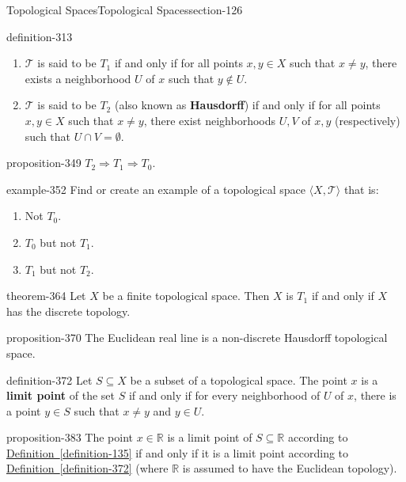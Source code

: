 \documentclass[oneside,10pt,]{article}
\newcommand{\terminology}[1]{\textbf{#1}}
\newcommand{\tuple}[1]{\langle #1 \rangle}
\newcommand{\mb}{\mathbb}
\newcommand{\mc}{\mathcal}
\begin{document}
\begin{sectionptx}{Topological Spaces}{}{Topological Spaces}{}{}{section-126}
\begin{definition}{}{definition-313}
\begin{enumerate}
\item\hypertarget{li-330}{}\(\mc T\) is said to be \terminology{\(T_1\)} if and only if for all points \(x,y\in X\) such that \(x\not=y\), there exists a neighborhood \(U\) of \(x\) such that \(y\not\in U\).%
\item\hypertarget{li-339}{}\(\mc T\) is said to be \terminology{\(T_2\)} (also known as \terminology{Hausdorff}) if and only if for all points \(x,y\in X\) such that \(x\not=y\), there exist neighborhoods \(U,V\) of \(x,y\) (respectively) such that \(U\cap V=\emptyset\).%
\end{enumerate}
\end{definition}
\begin{proposition}{}{}{proposition-349}%
\hypertarget{p-350}{}%
\(T_2\Rightarrow T_1\Rightarrow T_0\).%
\end{proposition}
\begin{example}{}{example-352}%
\hypertarget{p-353}{}%
Find or create an example of a topological space \(\tuple{X,\mc T}\) that is:%
\leavevmode%
\begin{enumerate}
\item\hypertarget{li-356}{}Not \(T_0\).%
\item\hypertarget{li-358}{}\(T_0\) but not \(T_1\).%
\item\hypertarget{li-361}{}\(T_1\) but not \(T_2\).%
\end{enumerate}
\end{example}
\begin{theorem}{}{}{theorem-364}%
\hypertarget{p-365}{}%
Let \(X\) be a finite topological space. Then \(X\) is \(T_1\) if and only if \(X\) has the discrete topology.%
\end{theorem}
\begin{proposition}{}{}{proposition-370}%
\hypertarget{p-371}{}%
The Euclidean real line is a non-discrete Hausdorff topological space.%
\end{proposition}
\begin{definition}{}{definition-372}%
\hypertarget{p-373}{}%
Let \(S\subseteq X\) be a subset of a topological space. The point \(x\) is a \terminology{limit point} of the set \(S\) if and only if for every neighborhood of \(U\) of \(x\), there is a point \(y\in S\) such that \(x\not=y\) and \(y\in U\).%
\end{definition}
\begin{proposition}{}{}{proposition-383}%
\hypertarget{p-384}{}%
The point \(x\in\mb R\) is a limit point of \(S\subseteq \mb R\) according to \hyperref[definition-135]{Definition~\ref{definition-135}} if and only if it is a limit point according to \hyperref[definition-372]{Definition~\ref{definition-372}} (where \(\mb R\) is assumed to have the Euclidean topology).%

\end{proposition}
\end{sectionptx}
\end{document}
